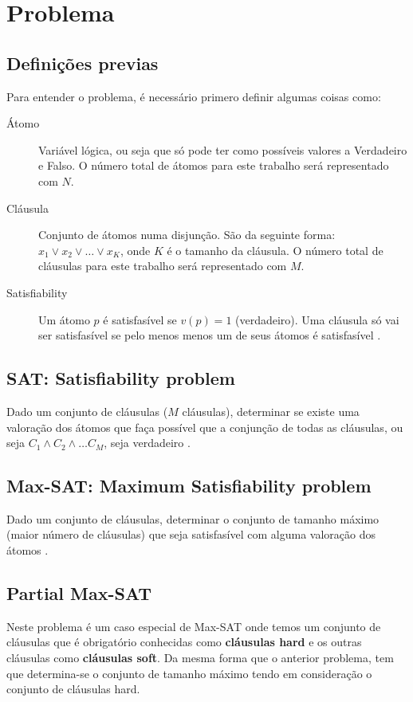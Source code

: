 \section{Problema} 

\subsection{Definições previas}
	Para entender o problema, é necessário primero definir algumas coisas como:
	\begin{description}
		\item[Átomo] Variável lógica, ou seja que só pode ter como possíveis valores a Verdadeiro e Falso. O número total de átomos para este trabalho será representado com $N$.
		\item[Cláusula] Conjunto de átomos numa disjunção. São da seguinte forma: $x_1 \lor x_2 \lor \ldots \lor x_K$, onde $K$ é o tamanho da cláusula. O número total de cláusulas para este trabalho será representado com $M$.
		\item[Satisfiability] Um átomo $p$ é satisfasível se $v( p ) = 1$ (verdadeiro). Uma cláusula só vai ser satisfasível se pelo menos menos um de seus átomos é satisfasível \cite{Satisfiability09}.
	\end{description}

\subsection{SAT: Satisfiability problem}
	Dado um conjunto de cláusulas ($M$ cláusulas), determinar se existe uma valoração dos átomos que faça possível que a conjunção de todas as cláusulas, ou seja $C_1 \land C_2 \land \ldots C_M$, seja verdadeiro \cite{LabIA15}.

\subsection{Max-SAT: Maximum Satisfiability problem}
	Dado um conjunto de cláusulas, determinar o conjunto de tamanho máximo (maior número de cláusulas) que seja satisfasível com alguma valoração dos átomos \cite{LabIA15}.

\subsection{Partial Max-SAT}
	Neste problema é um caso especial de Max-SAT onde temos um conjunto de cláusulas que é obrigatório conhecidas como \textbf{cláusulas hard} e os outras cláusulas como \textbf{cláusulas soft}. Da mesma forma que o anterior problema, tem que determina-se o conjunto de tamanho máximo tendo em consideração o conjunto de cláusulas hard.


